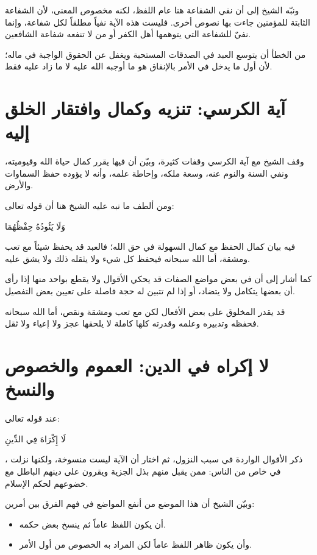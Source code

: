ونبّه الشيخ إلى أن نفي الشفاعة هنا عام اللفظ، لكنه مخصوص المعنى، لأن الشفاعة الثابتة للمؤمنين جاءت بها نصوص أخرى. فليست هذه الآية نفياً مطلقاً لكل شفاعة، وإنما نفيٌ للشفاعة التي يتوهمها أهل الكفر أو من لا تنفعه شفاعة الشافعين.

\begin{fawaid}
من الخطأ أن يتوسع العبد في الصدقات المستحبة ويغفل عن الحقوق الواجبة في ماله؛ لأن أول ما يدخل في الأمر بالإنفاق هو ما أوجبه الله عليه لا ما زاد عليه فقط.
\end{fawaid}

\section{آية الكرسي: تنزيه وكمال وافتقار الخلق إليه}
وقف الشيخ مع آية الكرسي وقفات كثيرة، وبيّن أن  فيها يقرر كمال حياة الله وقيوميته، ونفي السنة والنوم عنه، وسعة ملكه، وإحاطة علمه، وأنه لا يؤوده حفظ السماوات والأرض.

ومن ألطف ما نبه عليه الشيخ هنا أن قوله تعالى: \begin{ayah}وَلَا يَئُودُهُ حِفْظُهُمَا\end{ayah} فيه بيان كمال الحفظ مع كمال السهولة في حق الله؛ فالعبد قد يحفظ شيئاً مع تعب ومشقة، أما الله سبحانه فيحفظ كل شيء ولا يثقله ذلك ولا يشق عليه.

كما أشار إلى أن  في بعض مواضع الصفات قد يحكي الأقوال ولا يقطع بواحد منها إذا رأى أن بعضها يتكامل ولا يتضاد، أو إذا لم تتبين له حجة فاصلة على تعيين بعض التفصيل.

\begin{fawaid}
قد يقدر المخلوق على بعض الأفعال لكن مع تعب ومشقة ونقص، أما الله سبحانه فحفظه وتدبيره وعلمه وقدرته كلها كاملة لا يلحقها عجز ولا إعياء ولا ثقل.
\end{fawaid}

\section{لا إكراه في الدين: العموم والخصوص والنسخ}
عند قوله تعالى: \begin{ayah}لَا إِكْرَاهَ فِي الدِّينِ\end{ayah}، ذكر  الأقوال الواردة في سبب النزول، ثم اختار أن الآية ليست منسوخة، ولكنها نزلت في خاص من الناس: ممن يقبل منهم بذل الجزية ويقرون على دينهم الباطل مع خضوعهم لحكم الإسلام.

وبيّن الشيخ أن هذا الموضع من أنفع المواضع في فهم الفرق بين أمرين:
\begin{itemize}
    \item أن يكون اللفظ عاماً ثم ينسخ بعض حكمه.
    \item وأن يكون ظاهر اللفظ عاماً لكن المراد به الخصوص من أول الأمر.
\end{itemize}

